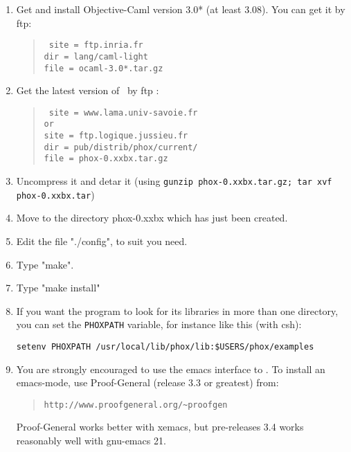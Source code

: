 \begin{enumerate}
\item Get and install Objective-Caml version 3.0* (at least 3.08). You can get
it by ftp:
\begin{quote}\tt
                site = ftp.inria.fr \\
                dir = lang/caml-light \\
                file = ocaml-3.0*.tar.gz
\end{quote}

\item Get the latest version of \AFD\ by 
ftp :
\begin{quote}\tt
                site = www.lama.univ-savoie.fr \\
                       or\\
                site = ftp.logique.jussieu.fr \\
                dir  = pub/distrib/phox/current/ \\
                file = phox-0.xxbx.tar.gz
\end{quote}

\item Uncompress it and detar it (using {\tt gunzip phox-0.xxbx.tar.gz; tar xvf
  phox-0.xxbx.tar})
     
\item Move to the directory phox-0.xxbx which has just been created.
          
\item Edit the file "./config", to suit you need.

\item Type "make".

\item Type "make install" 
  
\item If you want the program to look for its libraries in more than one
  directory, you can set the {\tt PHOXPATH} variable, for instance like
  this (with csh):

\begin{verbatim}
setenv PHOXPATH /usr/local/lib/phox/lib:$USERS/phox/examples
\end{verbatim}

\item You are strongly encouraged to use the emacs interface to \AFD.
To install an emacs-mode, use Proof-General (release 3.3 or greatest)
from:

\begin{quote}
\verb#http://www.proofgeneral.org/~proofgen#
\end{quote}

Proof-General works better with xemacs, but pre-releases 3.4 works
reasonably well with gnu-emacs 21.

\end{enumerate}


